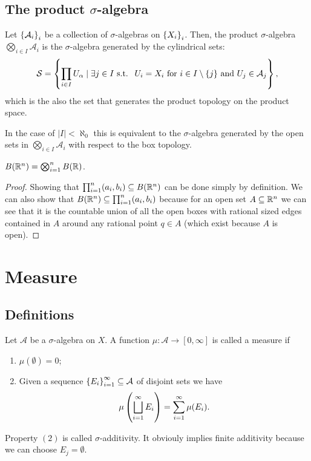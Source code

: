 \documentclass[11pt,a4paper]{article}
\newcommand{\A}{\mathcal A}
\begin{document}
\subsection{The product \texorpdfstring{$\sigma$}{s}-algebra}

\begin{definition}
  Let $\set{\A_{i}}_{i}$ be a collection of $\sigma$-algebras on
  $\left\{X_{i}\right\}_{i}$.
  Then, the product $\sigma$-algebra $\bigotimes_{i \in I} \A_{i}$ is
  the $\sigma$-algebra generated by the cylindrical sets:
  \[
    \mathcal{S} = \set{\prod_{i \in I}{U_{\alpha}} \mid 
    \exists j \in I \st 
    \text{ $U_{i} = X_{i}$ 
    for $i \in I \setminus \{j\}$ and $U_j \in \A_j$}},
  \]
  which is the also the set that generates the product topology on
  the product space.
\end{definition}
\begin{remark}
  In the case of $|I| < \aleph_0$ this is equivalent to the $\sigma$-algebra
  generated by the open sets in $\bigotimes_{i \in I} \A_i$ with respect to the
  box topology.
\end{remark}

\begin{proposition}
  $B(\mathbb{R}^n) = \bigotimes_{i=1}^{n} B(\mathbb{R})$.
\end{proposition}
\begin{proof}
  Showing that $\prod_{i=1}^{n} (a_i, b_i) \subseteq B(\mathbb{R}^n)$ can be
  done simply by definition.
  We can also show that $B(\mathbb{R}^n) \subseteq \prod_{i=1}^{n} (a_i, b_i)$
  because for an open set $A \subseteq \mathbb{R}^n$ we
  can see that it is the countable union of all the open boxes with
  rational sized edges contained in $A$ around any rational point $q \in A$
  (which exist because $A$ is open).
\end{proof}

\newpage

\section{Measure}
\subsection{Definitions}

\begin{definition}[Measure]
  Let $\A$ be a $\sigma$-algebra on $X$.
  A function $\mu \colon \A \to [0,\infty]$ is called a measure if
  \begin{enumerate}
  \item[(1)] $\mu(\emptyset) = 0$;
  \item[(2)] Given a sequence $\set{E_i}_{i=1}^{\infty} \subseteq \A$ of
    disjoint sets we have
    \[
      \mu\del{\bigsqcup_{i=1}^{\infty} E_i} =
      \sum_{i=1}^{\infty} \mu(E_i).
    \]
  \end{enumerate}
\end{definition}
\begin{remark}
  Property $(2)$ is called $\sigma$-additivity.
  It obviouly implies finite additivity because we can choose 
  $E_j = \emptyset$.
\end{remark}
\end{document}
